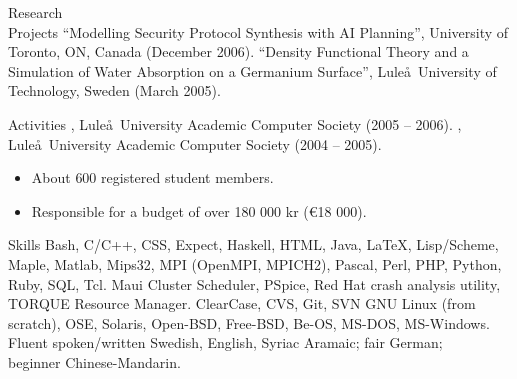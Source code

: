 \documentclass{../../cls/cv}
\begin{document}
\begin{category}{Research \\ Projects}
\citembullet ``Modelling Security Protocol Synthesis with AI Planning'', University of Toronto, ON, Canada (December 2006).
\citembullet ``Density Functional Theory and a Simulation of Water Absorption on a Germanium Surface'', Lule\aa\ University of Technology, Sweden (March 2005).
\end{category}


\begin{category}{Activities}
, Lule\aa \ University Academic
Computer Society (2005 -- 2006).
, Lule\aa \ University Academic Computer Society
(2004 -- 2005).
\begin{itemize}
\item About $600$ registered student members.
\item Responsible for a budget of over 180 000 kr (\euro18 000).
\end{itemize}
\end{category}

\begin{category}{Skills}
\citembullet Bash, C/C++, CSS, Expect, Haskell, HTML, Java, \LaTeX, Lisp/Scheme, Maple, Matlab,
Mips32, MPI (OpenMPI, MPICH2), Pascal, Perl, PHP, Python, Ruby, SQL, Tcl.
\citembullet Maui Cluster Scheduler, PSpice, Red Hat crash analysis utility, TORQUE Resource Manager.
\citembullet ClearCase, CVS, Git, SVN
\citembullet GNU Linux (from scratch), OSE, Solaris, Open-BSD, Free-BSD, Be-OS, MS-DOS, MS-Windows.
\citembullet Fluent spoken/written Swedish, English, Syriac Aramaic;
fair German; \\ beginner Chinese-Mandarin.
\end{category}


\end{document}
